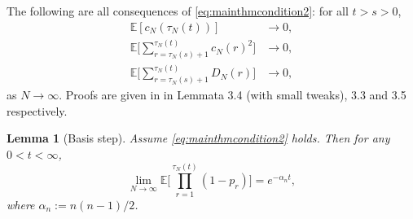\documentclass[12pt,authoryear]{article}
\newtheorem{lemma}{Lemma}
\theoremstyle{definition}
\newcommand{\E}{\mathbb{E}}
\newcommand{\1}[1]{\mathbbm{1}_{#1}}
\begin{document}
The following are all consequences of \eqref{eq:mainthmcondition2}: for all $t>s>0$,
\begin{align}
\E \left[ c_N(\tau_N(t)) \right] &\rightarrow 0, \label{eq:BJJK_eq3.3}\\
\E\Bigg[ \sum_{r=\tau_N(s)+1}^{\tau_N(t)} c_N(r)^2 \Bigg] &\rightarrow 0,
        \label{eq:BJJK_eq3.5}\\
\E\Bigg[ \sum_{r=\tau_N(s)+1}^{\tau_N(t)} D_N(r) \Bigg] &\rightarrow 0,
        \label{eq:BJJK_eq3.4}
\end{align}
as $N\to\infty$. Proofs are given in \citet{brown2021} in Lemmata 3.4 (with small tweaks), 3.3 and 3.5 respectively.

\begin{lemma}[Basis step]\label{thm:basis}
Assume \eqref{eq:mainthmcondition2} holds.
Then for any $0 < t < \infty$,
\begin{equation*}
\lim_{N\to\infty} \E\Bigg[ \prod_{r=1}^{\tau_N(t)} (1-p_r) \Bigg]
= e^{-\alpha_n t},
\end{equation*}
where $\alpha_n := n(n-1)/2$.
\end{lemma}
\end{document}
